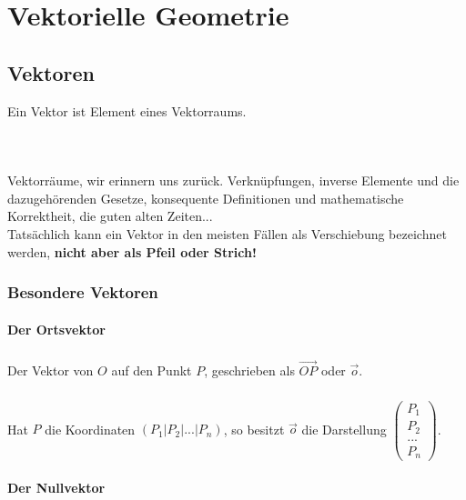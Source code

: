 \chapter{Vektorielle Geometrie}


\section{Vektoren}
\begin{Definition}
Ein Vektor ist Element eines Vektorraums.
\end{Definition}\\
\paragraph{} Vektorräume, wir erinnern uns zurück. Verknüpfungen, inverse Elemente und die dazugehörenden Gesetze, konsequente Definitionen und mathematische Korrektheit, die guten alten Zeiten...\\
Tatsächlich kann ein Vektor in den meisten Fällen als Verschiebung bezeichnet werden, \textbf{nicht aber als Pfeil oder Strich!}\\

\subsection{Besondere Vektoren}

\subsubsection{Der Ortsvektor}

\paragraph{} Der Vektor von $O$ auf den Punkt $P$, geschrieben als $\vec{OP}$ oder $\vec{o}$.\\
\paragraph{} Hat $P$ die Koordinaten $(P_1|P_2|...|P_n)$, so besitzt $\vec{o}$ die Darstellung $\left(\begin{array}{c} P_1 \\ P_2 \\ ...\\P_n\end{array}\right)$.
\subsubsection{Der Nullvektor}
